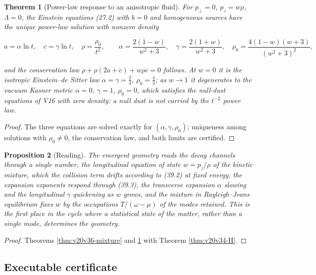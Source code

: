 \documentclass[11pt]{article}
\newtheorem{theorem}{Theorem}[section]
\newtheorem{proposition}[theorem]{Proposition}
\theoremstyle{remark}
\begin{document}
\begin{theorem}[Power-law response to an anisotropic fluid]
\label{thm:v20v36-kasner}
For \(p_\perp=0\), \(p_z=w\rho\), \(\Lambda=0\), the Einstein equations
(27.2) with \(b=0\) and homogeneous sources have the unique
power-law solution with nonzero density

\[
 a=\alpha\ln t,\quad c=\gamma\ln t,\quad \rho=\frac{\rho_0}{t^2},\qquad
 \alpha=\frac{2(1-w)}{w^2+3},\quad \gamma=\frac{2(1+w)}{w^2+3},\quad
 \rho_0=\frac{4(1-w)(w+3)}{(w^2+3)^2},                                   \tag{39.3}
\]

and the conservation law \(\dot\rho+\rho(2\dot a+\dot c)+w\rho\dot c=0\)
follows.  At \(w=0\) it is the isotropic Einstein--de Sitter law
\(\alpha=\gamma=\tfrac23\), \(\rho_0=\tfrac43\); as \(w\to1\) it
degenerates to the vacuum Kasner metric \(\alpha=0\), \(\gamma=1\),
\(\rho_0=0\), which satisfies the null-dust equations of V16 with
zero density: a null dust is not carried by the \(t^{-2}\) power law.
\end{theorem}

\begin{proof}
The three equations are solved exactly for \((\alpha,\gamma,\rho_0)\);
uniqueness among solutions with \(\rho_0\neq0\), the conservation
law, and both limits are certified.
\end{proof}

\begin{proposition}[Reading]
\label{prop:v20v36-reading}
The emergent geometry reads the decay channels through a single
number, the longitudinal equation of state \(w=p_z/\rho\) of the
kinetic mixture, which the collision term drifts according to (39.2)
at fixed energy; the expansion exponents respond through (39.3),
the transverse expansion \(\alpha\) slowing and the longitudinal
\(\gamma\) quickening as \(w\) grows, and the mixture in
Rayleigh--Jeans equilibrium fixes \(w\) by the occupations
\(T/(\omega-\mu)\) of the modes retained.  This is the first place in
the cycle where a statistical state of the matter, rather than a
single mode, determines the geometry.
\end{proposition}

\begin{proof}
Theorems \ref{thm:v20v36-mixture} and \ref{thm:v20v36-kasner} with
Theorem \ref{thm:v20v34-H}.
\end{proof}

\subsection{Executable certificate}
\end{document}
